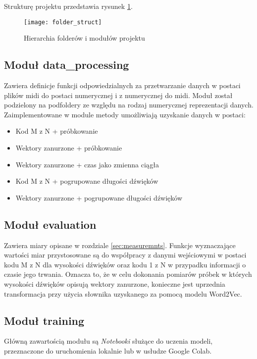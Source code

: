 {{        Strukturę projektu przedstawia rysunek \ref{folder_struct}.

        \begin{figure}
            \centering
            \texttt{[image: folder\_struct]}
            \caption{Hierarchia folderów i modułów projektu}
            \label{folder_struct}
        \end{figure}

        \subsection{Moduł data\_processing}
        {
            Zawiera definicje funkcji odpowiedzialnych za przetwarzanie danych w postaci plików midi do postaci numerycznej i z numerycznej do midi. Moduł został podzielony na podfoldery ze względu na rodzaj numerycznej reprezentacji danych. Zaimplementowane w module metody umożliwiają uzyskanie danych w postaci:
            \begin{itemize}
                \setlength\itemsep{-0.5em}
                \item Kod  M\,\,z\,\,N + próbkowanie
                \item Wektory zanurzone + próbkowanie
                \item Wektory zanurzone + czas jako zmienna ciągła
                \item Kod  M\,\,z\,\,N + pogrupowane długości dźwięków
                \item Wektory zanurzone + pogrupowane długości dźwięków
            \end{itemize}


        }

        \subsection{Moduł evaluation}
        {
            Zawiera miary opisane w rozdziale \ref{sec:measuremnts}. Funkcje wyznaczające wartości miar przystosowane są do współpracy z danymi wejściowymi w postaci kodu M\,\,z\,\,N dla wysokości dźwięków oraz kodu 1\,\,z\,\,N w przypadku informacji o czasie jego trwania. Oznacza to, że w celu dokonania pomiarów próbek w których wysokości dźwięków opisują wektory zanurzone, konieczne jest uprzednia transformacja przy użycia słownika uzyskanego za pomocą modelu Word2Vec.
        }

        \subsection{Moduł training}
        {
            Główną zawartością modułu są {\textit {Notebooki}} służące do uczenia modeli, przeznaczone do uruchomienia lokalnie lub w usłudze Google Colab. 
        }

}}
